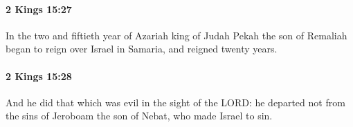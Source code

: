 		\paragraph{2 Kings 15:27} %
			\label{2KINGS-15-27}

			In the two and fiftieth year of Azariah king of Judah Pekah the son of Remaliah began to reign over Israel in Samaria, and reigned twenty years.


		\paragraph{2 Kings 15:28} %
			\label{2KINGS-15-28}

			And he did that which was evil in the sight of the LORD: he departed not from the sins of Jeroboam the son of Nebat, who made Israel to sin.


